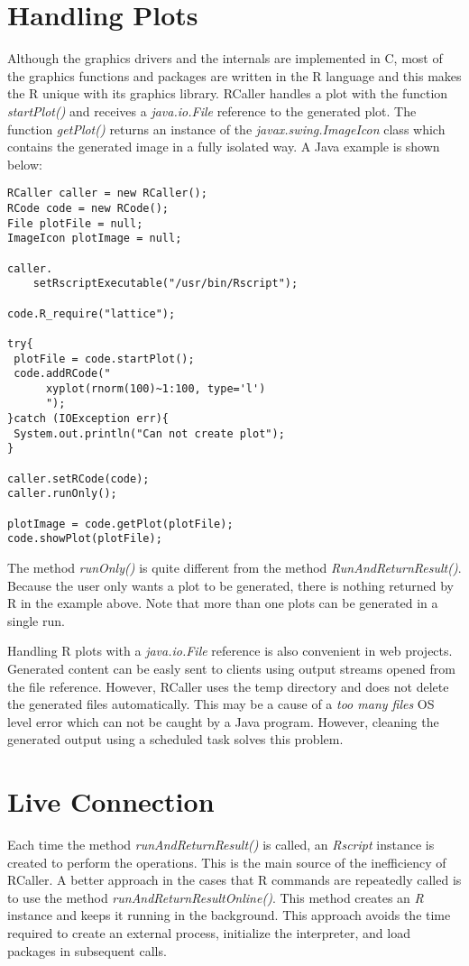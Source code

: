 \documentclass[10pt,a4paper]{article}
\begin{document}
\section{Handling Plots}
Although the graphics drivers and the internals are implemented in C, most of the graphics functions and packages are written in the R language
and this makes the R unique with its graphics library. RCaller handles a plot with the function \emph{startPlot()} and receives a \emph{java.io.File}
reference to the generated plot. The function \emph{getPlot()} returns an instance of the  \emph{javax.swing.ImageIcon} class which contains the generated image 
in a fully isolated way. A Java example is shown below:
\begin{verbatim}
RCaller caller = new RCaller();
RCode code = new RCode();
File plotFile = null;
ImageIcon plotImage = null;
    
caller.
	setRscriptExecutable("/usr/bin/Rscript");
    
code.R_require("lattice");
    
try{
 plotFile = code.startPlot();
 code.addRCode("
      xyplot(rnorm(100)~1:100, type='l')
      ");
}catch (IOException err){
 System.out.println("Can not create plot");
}
    
caller.setRCode(code);
caller.runOnly();
    
plotImage = code.getPlot(plotFile);
code.showPlot(plotFile);
\end{verbatim}

The method \emph{runOnly()} is quite different from the method \emph{RunAndReturnResult()}. Because the user only wants a plot to be generated, 
there is nothing returned by R in the example above. Note that more than one plots can be generated in a single run.

Handling R plots with a \emph{java.io.File} reference is also convenient in web projects. Generated content can be easly sent to clients using
output streams opened from the file reference. However, RCaller uses the temp directory and does not delete the generated files automatically.
This may be a cause of a \emph{too many files} OS level error which can not be caught by a Java program. However, cleaning the generated output
using a scheduled task solves this problem.



\section{Live Connection}
Each time the method \emph{runAndReturnResult()} is called, an \emph{Rscript} instance is created to perform the operations. This is the 
main source of the inefficiency of RCaller. A better approach in the cases that R commands are repeatedly called is to use the method 
\emph{runAndReturnResultOnline()}. This method creates an \emph{R} instance and keeps it running in the background. This approach avoids the
time required to create an external process, initialize the interpreter, and load packages in subsequent calls.
\end{document}
